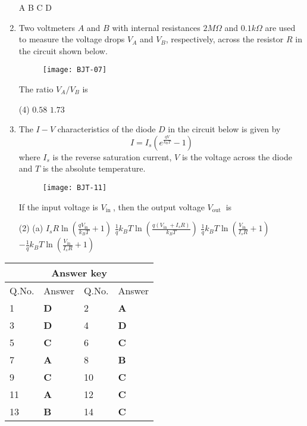 \begin{enumerate}
\begin{tasks}
		\task[\textbf{A.}] A
		\task[\textbf{B.}] B
		\task[\textbf{C.}] C
		\task[\textbf{D.}] D
	\end{tasks}
	\item Two voltmeters $A$ and $B$ with internal resistances $2 M \Omega$ and $0.1 k \Omega$ are used to measure the voltage drops $V_{A}$ and $V_{B}$, respectively, across the resistor $R$ in the circuit shown below.\\
	\begin{figure}[H]
		\centering
		\texttt{[image: BJT-07]}
	\end{figure}
	The ratio $V_{A} / V_{B}$ is
	{}
	\begin{tasks}(4)
		\task[\textbf{A.}] $0.58$
		\task[\textbf{B.}] $1.73$
	\end{tasks}
	\item The $I-V$ characteristics of the diode $D$ in the circuit below is given by
	$$
	I=I_{s}\left(e^{\frac{q V}{k_{\mathrm{B}} T}}-1\right)
	$$
	where $I_{s}$ is the reverse saturation current, $V$ is the voltage across the diode and $T$ is the absolute temperature.\\
	\begin{figure}[H]
		\centering
		\texttt{[image: BJT-11]}
	\end{figure}
	If the input voltage is $V_{\text {in }}$, then the output voltage $V_{\text {out }}$ is
	{}
	\begin{tasks}(2)
		\task[\textbf{A.}] (a) $I_{s} R \ln \left(\frac{q V_{\text {in }}}{k_{B} T}+1\right)$
		\task[\textbf{B.}] $\frac{1}{q} k_{B} T \ln \left(\frac{q\left(V_{\text {in }}+I_{s} R\right)}{k_{B} T}\right)$
		\task[\textbf{C.}]  $\frac{1}{q} k_{B} T \ln \left(\frac{V_{\text {in }}}{I_{s} R}+1\right)$
		\task[\textbf{D.}]  $-\frac{1}{q} k_{B} T \ln \left(\frac{V_{\text {in }}}{I_{s} R}+1\right)$
	\end{tasks}
\end{enumerate}
\setlength\arrayrulewidth{1pt}
\begin{table}[H]
	\centering
	\begin{tabular}{|p{1.5cm}|p{1.5cm}||p{1.5cm}|p{1.5cm}|}
		\hline
		\multicolumn{4}{|c|}{\textbf{Answer key}}\\\hline\hline
		\rowcolor{ocrel}Q.No.&Answer&Q.No.&Answer\\\hline
		1&\textbf{D} &2&\textbf{A}\\\hline 
		3&\textbf{D} &4&\textbf{D} \\\hline
		5&\textbf{C} &6&\textbf{C} \\\hline
		7&\textbf{A}&8&\textbf{B}\\\hline
		9&\textbf{C}&10&\textbf{C}\\\hline
		11&\textbf{A} &12&\textbf{C}\\\hline
		13&\textbf{B}&14&\textbf{C}\\\hline
	\end{tabular}
\end{table}
